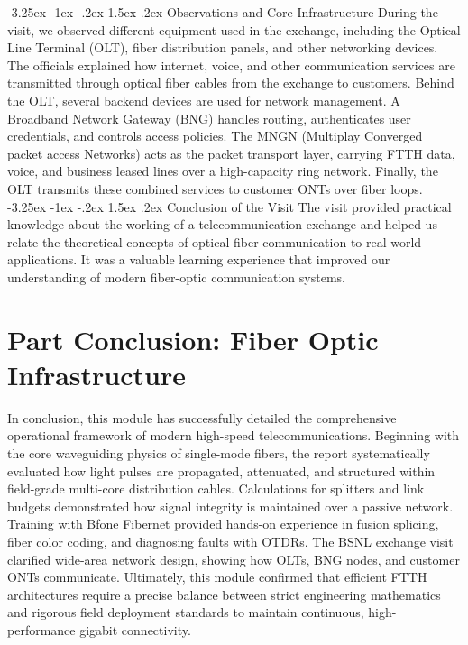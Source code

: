 \documentclass[11pt,a4paper]{report}
\makeatletter
\renewcommand{\section}{\@startsection{section}{1}{\z@}%
  {-3.25ex \@plus -1ex \@minus -.2ex}%
  {1.5ex \@plus.2ex}%
  {\normalfont\Large\bfseries\color{primaryColor}}}
\makeatother
\begin{document}
\section{Observations and Core Infrastructure}
During the visit, we observed different equipment used in the exchange, including the Optical Line Terminal (OLT), fiber distribution panels, and other networking devices. The officials explained how internet, voice, and other communication services are transmitted through optical fiber cables from the exchange to customers. Behind the OLT, several backend devices are used for network management. A Broadband Network Gateway (BNG) handles routing, authenticates user credentials, and controls access policies. The MNGN (Multiplay Converged packet access Networks) acts as the packet transport layer, carrying FTTH data, voice, and business leased lines over a high-capacity ring network. Finally, the OLT transmits these combined services to customer ONTs over fiber loops.
\section{Conclusion of the Visit}
The visit provided practical knowledge about the working of a telecommunication exchange and helped us relate the theoretical concepts of optical fiber communication to real-world applications. It was a valuable learning experience that improved our understanding of modern fiber-optic communication systems.
\chapter*{Part Conclusion: Fiber Optic Infrastructure}
In conclusion, this module has successfully detailed the comprehensive operational framework of modern high-speed telecommunications. Beginning with the core waveguiding physics of single-mode fibers, the report systematically evaluated how light pulses are propagated, attenuated, and structured within field-grade multi-core distribution cables. Calculations for splitters and link budgets demonstrated how signal integrity is maintained over a passive network. Training with Bfone Fibernet provided hands-on experience in fusion splicing, fiber color coding, and diagnosing faults with OTDRs. The BSNL exchange visit clarified wide-area network design, showing how OLTs, BNG nodes, and customer ONTs communicate. Ultimately, this module confirmed that efficient FTTH architectures require a precise balance between strict engineering mathematics and rigorous field deployment standards to maintain continuous, high-performance gigabit connectivity.
\end{document}
